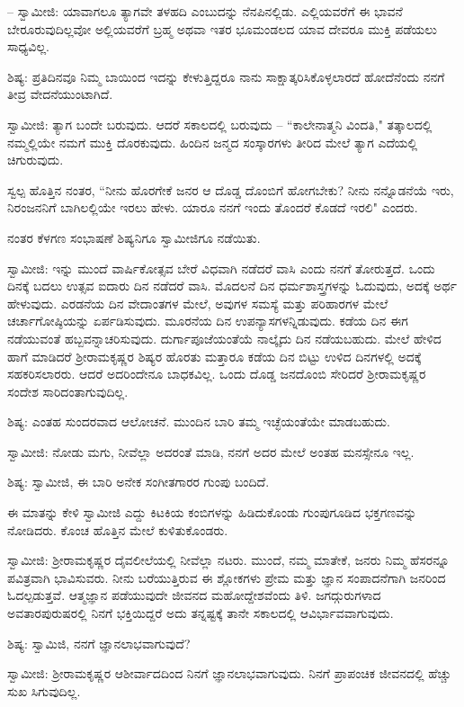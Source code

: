 – ಸ್ವಾಮೀಜಿ: ಯಾವಾಗಲೂ ತ್ಯಾಗವೇ ತಳಹದಿ ಎಂಬುದನ್ನು ನೆನಪಿನಲ್ಲಿಡು. ಎಲ್ಲಿಯವರೆಗೆ ಈ ಭಾವನೆ ಬೇರೂರುವುದಿಲ್ಲವೋ ಅಲ್ಲಿಯವರೆಗೆ ಬ್ರಹ್ಮ ಅಥವಾ ಇತರ ಭೂಮಂಡಲದ ಯಾವ ದೇವರೂ ಮುಕ್ತಿ ಪಡೆಯಲು ಸಾಧ್ಯವಿಲ್ಲ.

ಶಿಷ್ಯ: ಪ್ರತಿದಿನವೂ ನಿಮ್ಮ ಬಾಯಿಂದ ಇದನ್ನು ಕೇಳುತ್ತಿದ್ದರೂ ನಾನು ಸಾಕ್ಷಾತ್ಕರಿಸಿಕೊಳ್ಳಲಾರದೆ ಹೋದೆನೆಂದು ನನಗೆ ತೀವ್ರ ವೇದನೆಯುಂಟಾಗಿದೆ.

ಸ್ವಾಮೀಜಿ: ತ್ಯಾಗ ಬಂದೇ ಬರುವುದು. ಆದರೆ ಸಕಾಲದಲ್ಲಿ ಬರುವುದು – “ಕಾಲೇನಾತ್ಮನಿ ವಿಂದತಿ," ತತ್ಕಾಲದಲ್ಲಿ ನಮ್ಮಲ್ಲಿಯೇ ನಮಗೆ ಮುಕ್ತಿ ದೊರಕುವುದು. ಹಿಂದಿನ ಜನ್ಮದ ಸಂಸ್ಕಾರಗಳು ತೀರಿದ ಮೇಲೆ ತ್ಯಾಗ ಎದೆಯಲ್ಲಿ ಚಿಗುರುವುದು.

ಸ್ವಲ್ಪ ಹೊತ್ತಿನ ನಂತರ, “ನೀನು ಹೊರಗೇಕೆ ಜನರ ಆ ದೊಡ್ಡ ದೊಂಬಿಗೆ ಹೋಗಬೇಕು? ನೀನು ನನ್ನೊಡನೆಯೆ ಇರು, ನಿರಂಜನನಿಗೆ ಬಾಗಿಲಲ್ಲಿಯೇ ಇರಲು ಹೇಳು. ಯಾರೂ ನನಗೆ ಇಂದು ತೊಂದರೆ ಕೊಡದೆ ಇರಲಿ" ಎಂದರು.

ನಂತರ ಕೆಳಗಣ ಸಂಭಾಷಣೆ ಶಿಷ್ಯನಿಗೂ ಸ್ವಾಮೀಜಿಗೂ ನಡೆಯಿತು.

ಸ್ವಾಮೀಜಿ: ಇನ್ನು ಮುಂದೆ ವಾರ್ಷಿಕೋತ್ಸವ ಬೇರೆ ವಿಧವಾಗಿ ನಡೆದರೆ ವಾಸಿ ಎಂದು ನನಗೆ ತೋರುತ್ತದೆ. ಒಂದು ದಿನಕ್ಕೆ ಬದಲು ಉತ್ಸವ ಐದಾರು ದಿನ ನಡೆದರೆ ವಾಸಿ. ಮೊದಲನೆ ದಿನ ಧರ್ಮಶಾಸ್ತ್ರಗಳನ್ನು ಓದುವುದು, ಅದಕ್ಕೆ ಅರ್ಥ ಹೇಳುವುದು. ಎರಡನೆಯ ದಿನ ವೇದಾಂತಗಳ ಮೇಲೆ, ಅವುಗಳ ಸಮಸ್ಯೆ ಮತ್ತು ಪರಿಹಾರಗಳ ಮೇಲೆ ಚರ್ಚಾಗೋಷ್ಠಿಯನ್ನು ಏರ್ಪಡಿಸುವುದು. ಮೂರನೆಯ ದಿನ ಉಪನ್ಯಾಸಗಳನ್ನಿಡುವುದು. ಕಡೆಯ ದಿನ ಈಗ ನಡೆಯುವಂತೆ ಹಬ್ಬವನ್ನಾಚರಿಸುವುದು. ದುರ್ಗಾಪೂಜೆಯಂತೆಯೆ ನಾಲ್ಕೈದು ದಿನ ನಡೆಯಬಹುದು. ಮೇಲೆ ಹೇಳಿದ ಹಾಗೆ ಮಾಡಿದರೆ ಶ‍್ರೀರಾಮಕೃಷ್ಣರ ಶಿಷ್ಯರ ಹೊರತು ಮತ್ತಾರೂ ಕಡೆಯ ದಿನ ಬಿಟ್ಟು ಉಳಿದ ದಿನಗಳಲ್ಲಿ ಅದಕ್ಕೆ ಸಹಕರಿಸಲಾರರು. ಆದರೆ ಅದರಿಂದೇನೂ ಬಾಧಕವಿಲ್ಲ. ಒಂದು ದೊಡ್ಡ ಜನದೊಂಬಿ ಸೇರಿದರೆ ಶ‍್ರೀರಾಮಕೃಷ್ಣರ ಸಂದೇಶ ಸಾರಿದಂತಾಗುವುದಿಲ್ಲ.

ಶಿಷ್ಯ: ಎಂತಹ ಸುಂದರವಾದ ಆಲೋಚನೆ. ಮುಂದಿನ ಬಾರಿ ತಮ್ಮ ಇಚ್ಛೆಯಂತೆಯೇ ಮಾಡಬಹುದು.

ಸ್ವಾಮೀಜಿ: ನೋಡು ಮಗು, ನೀವೆಲ್ಲಾ ಅದರಂತೆ ಮಾಡಿ, ನನಗೆ ಅದರ ಮೇಲೆ ಅಂತಹ ಮನಸ್ಸೇನೂ ಇಲ್ಲ.

ಶಿಷ್ಯ: ಸ್ವಾಮೀಜಿ, ಈ ಬಾರಿ ಅನೇಕ ಸಂಗೀತಗಾರರ ಗುಂಪು ಬಂದಿದೆ.

ಈ ಮಾತನ್ನು ಕೇಳಿ ಸ್ವಾಮೀಜಿ ಎದ್ದು ಕಿಟಕಿಯ ಕಂಬಿಗಳನ್ನು ಹಿಡಿದುಕೊಂಡು ಗುಂಪುಗೂಡಿದ ಭಕ್ತಗಣವನ್ನು ನೋಡಿದರು. ಕೊಂಚ ಹೊತ್ತಿನ ಮೇಲೆ ಕುಳಿತುಕೊಂಡರು.

ಸ್ವಾಮೀಜಿ: ಶ‍್ರೀರಾಮಕೃಷ್ಣರ ದೈವಲೀಲೆಯಲ್ಲಿ ನೀವೆಲ್ಲಾ ನಟರು. ಮುಂದೆ, ನಮ್ಮ ಮಾತೇಕೆ, ಜನರು ನಿಮ್ಮ ಹೆಸರನ್ನೂ ಪವಿತ್ರವಾಗಿ ಭಾವಿಸುವರು. ನೀನು ಬರೆಯುತ್ತಿರುವ ಈ ಶ್ಲೋಕಗಳು ಪ್ರೇಮ ಮತ್ತು ಜ್ಞಾನ ಸಂಪಾದನೆಗಾಗಿ ಜನರಿಂದ ಓದಲ್ಪಡುತ್ತವೆ. ಆತ್ಮಜ್ಞಾನ ಪಡೆಯುವುದೇ ಜೀವನದ ಮಹೋದ್ದೇಶವೆಂದು ತಿಳಿ. ಜಗದ್ಗುರುಗಳಾದ ಅವತಾರಪುರುಷರಲ್ಲಿ ನಿನಗೆ ಭಕ್ತಿಯಿದ್ದರೆ ಅದು ತನ್ನಷ್ಟಕ್ಕೆ ತಾನೇ ಸಕಾಲದಲ್ಲಿ ಆವಿರ್ಭಾವವಾಗುವುದು.

ಶಿಷ್ಯ: ಸ್ವಾಮಿಜಿ, ನನಗೆ ಜ್ಞಾನಲಾಭವಾಗುವುದೆ?

ಸ್ವಾಮೀಜಿ: ಶ‍್ರೀರಾಮಕೃಷ್ಣರ ಆಶೀರ್ವಾದದಿಂದ ನಿನಗೆ ಜ್ಞಾನಲಾಭವಾಗುವುದು. ನಿನಗೆ ಪ್ರಾಪಂಚಿಕ ಜೀವನದಲ್ಲಿ ಹೆಚ್ಚು ಸುಖ ಸಿಗುವುದಿಲ್ಲ.

